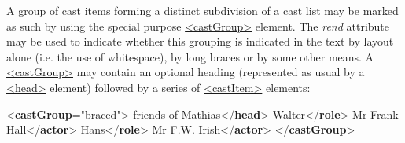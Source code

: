 A group of cast items forming a distinct subdivision of a cast list may be marked as such by using the special purpose \hyperref[TEI.castGroup]{<castGroup>} element. The {\itshape rend} attribute may be used to indicate whether this grouping is indicated in the text by layout alone (i.e. the use of whitespace), by long braces or by some other means. A \hyperref[TEI.castGroup]{<castGroup>} may contain an optional heading (represented as usual by a \hyperref[TEI.head]{<head>} element) followed by a series of \hyperref[TEI.castItem]{<castItem>} elements: \par\bgroup{}\exampleFont \begin{shaded}\noindent\mbox{}{<\textbf{castGroup}\hspace*{1em}{rend}="{braced}">}\mbox{}\newline 
{}friends of Mathias{</\textbf{head}>}\mbox{}\newline 
{}\mbox{}\newline 
\hspace*{1em}Walter{</\textbf{role}>}\mbox{}\newline 
\hspace*{1em}Mr Frank Hall{</\textbf{actor}>}\mbox{}\newline 
{}\mbox{}\newline 
{}\mbox{}\newline 
\hspace*{1em}Hans{</\textbf{role}>}\mbox{}\newline 
\hspace*{1em}Mr F.W. Irish{</\textbf{actor}>}\mbox{}\newline 
{}\mbox{}\newline 
{</\textbf{castGroup}>}\end{shaded}\egroup\par \noindent  \par
